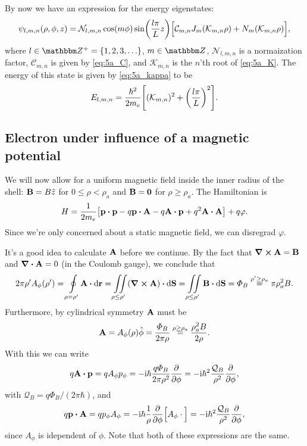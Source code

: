\documentclass[11pt,letter, swedish, english
]{article}
\begin{document}
By now we have an expression for the energy eigenstates:
\begin{equation}
\psi_{l,m,n}(\rho, \phi, z)=
\mathcal{N}_{l,m,n}\cos(m\phi)\sin(\frac{l\pi}{L}z)
\Big[\mathcal{C}_{m,n}J_m\qty(\mathcal{K}_{m,n}\rho)+
N_m\qty(\mathcal{K}_{m,n}\rho) \Big],
\end{equation}
where $l\in\Z^+=\{1, 2, 3,\ldots\}$, $m\in\Z$, $\mathcal{N}_{l,m,n}$
is a normaization factor,  $\mathcal{C}_{m,n}$ is given by
\eqref{eq:5a_C}, and $\mathcal{K}_{m,n}$ is the $n$'th root of
\eqref{eq:5a_K}. The energy of this state is given by
\eqref{eq:5a_kappa} to be
\begin{equation}
E_{l,m,n}=\frac{\hbar^2}{2m_e}\qty[(\mathcal{K}_{m,n})^2 + \qty(\frac{l\pi}{L})^2].
\end{equation}




\subsection{Electron under influence of a magnetic potential}
\newcommand{\q}{\ensuremath{\mathcal{Q}_B}}
We will now allow for a uniform magnetic field inside the inner radius of
the shell: $\vb{B}=B\hat{z}$ for $0\le\rho<\rho_a$ and $\vb{B}=\vb{0}$
for $\rho\ge\rho_a$. The Hamiltonian is 
\begin{equation}
H=\frac{1}{2m_e}\qty[\vb{p}\vdot\vb{p}
-q\vb{p}\vdot\vb{A}-q\vb{A}\vdot\vb{p}+q^2\vb{A}\vdot\vb{A}] 
+ q\varphi.
\end{equation}
Since we're only concerned about a static magnetic field, we can
disregrad $\varphi$.

It's a good idea to calculate $\vb{A}$ before we continue. By the
fact that $\curl{\vb{A}}=\vb{B}$ and
$\div\vb{A}=0$ (in the Coulomb gauge), we conclude that
\begin{equation}\label{eq:5b_Aphi}
2\pi\rho' A_\phi(\rho')=\oint\limits_{\rho=\rho'}\!\vb{A}\vdot\rd{\vb{r}}
=\iint\limits_{\rho\le\rho'}(\curl\vb{A})\vdot\rd\vb{S}
=\iint\limits_{\rho\le\rho'}\vb{B}\vdot\rd\vb{S}
=\varPhi_B\stackrel{\rho'\ge\rho_a}{=}\pi\rho_a^2B.
\end{equation}
Furthermore, by cylindrical symmetry $\vb{A}$ must be
\begin{equation}
\vb{A}=A_\phi(\rho)\hat\phi=\frac{\varPhi_B}{2\pi\rho}
\stackrel{\rho\ge\rho_a}{=}\frac{\rho_a^2B}{2\rho}.
\end{equation}
With this we can write
\begin{equation}
q\vb{A}\vdot\vb{p}= qA_\phi p_\phi
=-\ii\hbar\frac{q\varPhi_B}{2\pi\rho^2}\pdv{\phi}
=-\ii\hbar^2\frac{\q}{\rho^2}\pdv{\phi},
\end{equation}
with $\q=q\varPhi_B/(2\pi\hbar)$, and
\begin{equation}
q\vb{p}\vdot\vb{A}=qp_\phi A_\phi 
= -\ii\hbar\frac{1}{\rho}\pdv{\phi}\Big[A_\phi\cdot\Big]
=-\ii\hbar^2\frac{\q}{\rho^2}\pdv{\phi},
\end{equation}
since $A_\phi$ is idependent of $\phi$.
Note that both of these expressions are the same.
\end{document}
